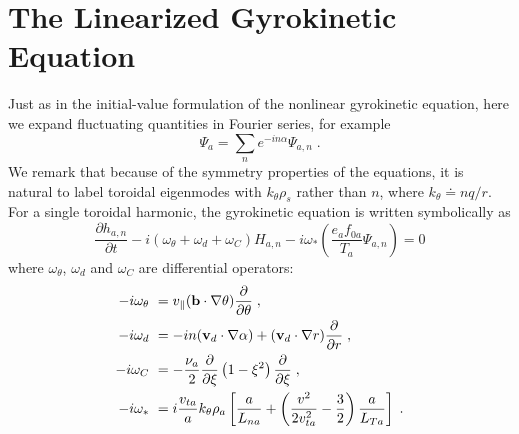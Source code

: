 \section{The Linearized Gyrokinetic Equation}

Just as in the initial-value formulation of the nonlinear gyrokinetic 
equation, here we expand fluctuating quantities in Fourier series, for 
example
%
\begin{equation}
\Psi_a = \sum_n e^{-in\alpha} \Psi_{a,n} \; .
\end{equation}
%
We remark that because of the symmetry properties of the equations, 
it is natural to label toroidal eigenmodes with $k_\theta \rho_s$
rather than $n$, where $k_\theta \doteq n q/r$.  For a single toroidal 
harmonic, the gyrokinetic equation is written symbolically as
%
\begin{equation}
\frac{\partial h_{a,n}}{\partial t} - i(\omega_\theta + \omega_d + \omega_C) H_{a,n} 
-i \omega_* (\frac{e_a f_{0a}}{T_a} \Psi_{a,n}) = 0
\end{equation}
%
where $\omega_\theta$, $\omega_d$ and $\omega_C$ are differential operators:
%
\begin{align}
-i \omega_\theta &~= 
 v_\parallel (\mathbf{b} \cdot \nabla\theta) \frac{\partial}{\partial\theta} \; , 
\label{eq.omtheta}\\
-i \omega_d &~= -i n (\mathbf{v}_d \cdot \nabla\alpha) + 
 (\mathbf{v}_d\cdot\nabla r)\frac{\partial}{\partial r} \; , 
\label{eq.omdrift}\\
-i \omega_C &~= - \frac{\nu_a}{2} \frac{\partial}{\partial\xi} 
 \left( 1-\xi^2\right) \frac{\partial}{\partial\xi} \; ,
\label{eq.omcoll}\\
-i \omega_* &~= i \frac{v_{ta}}{a} k_\theta \rho_a \left[ 
\frac{a}{L_{na}} + 
 \left(\frac{v^2}{2 v_{ta}^2}-\frac{3}{2} \right) \frac{a}{L_{Ta}} \right] \; .
\label{eq.omstar}
\end{align}

